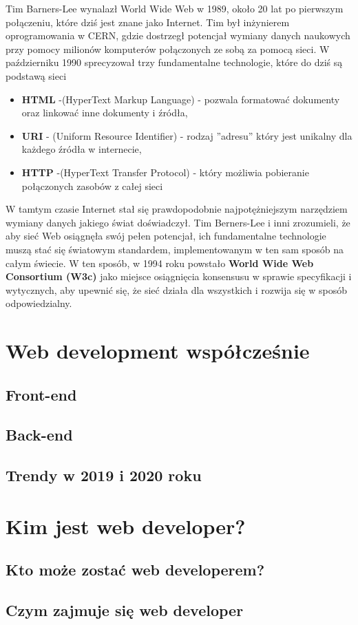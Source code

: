 \documentclass[12pt]{report}
\begin{document}
	Tim Barners-Lee wynalazł World Wide Web w  1989, około 20 lat po pierwszym połączeniu, które dziś jest znane 
	jako Internet. Tim był inżynierem oprogramowania w CERN, gdzie dostrzegł potencjał wymiany danych naukowych przy pomocy
	milionów komputerów połączonych ze sobą za pomocą sieci.
	\newline
	W październiku 1990 sprecyzował trzy fundamentalne technologie, które do dziś są podstawą sieci
	\begin{itemize}
	\item \textbf{HTML} -(HyperText Markup Language) - pozwala formatować dokumenty oraz linkować inne dokumenty i źródła,
	\item \textbf{URI} - (Uniform Resource Identifier) - rodzaj ''adresu'' który jest unikalny dla każdego źródła w internecie,
	\item \textbf{HTTP} -(HyperText Transfer Protocol) - który możliwia pobieranie połączonych zasobów z całej sieci
	\end{itemize}
	
	W tamtym czasie Internet stał się prawdopodobnie najpotężniejszym narzędziem wymiany danych jakiego świat doświadczył. 
	\newline
	Tim Berners-Lee i inni zrozumieli, że aby sieć Web osiągnęła swój pełen potencjał, ich fundamentalne technologie muszą stać
	się światowym standardem, implementowanym w ten sam sposób na całym świecie. W ten sposób, w 1994 roku powstało
	\textbf{World Wide Web Consortium (W3c)} jako miejsce osiągnięcia konsensusu w sprawie specyfikacji i wytycznych, aby upewnić
	się, że sieć działa dla wszystkich i rozwija się w sposób odpowiedzialny.
	
	\newpage 
	\chapter{Web development współcześnie}
	\section{Front-end}
	\newpage
	\section{Back-end}
	\newpage
	\section{Trendy w 2019 i 2020 roku}


	\newpage
	\chapter{Kim jest web developer?}
	\section{Kto może zostać web developerem?}
	\newpage
	\section{Czym zajmuje się web developer}

\tableofcontents
\end{document}
